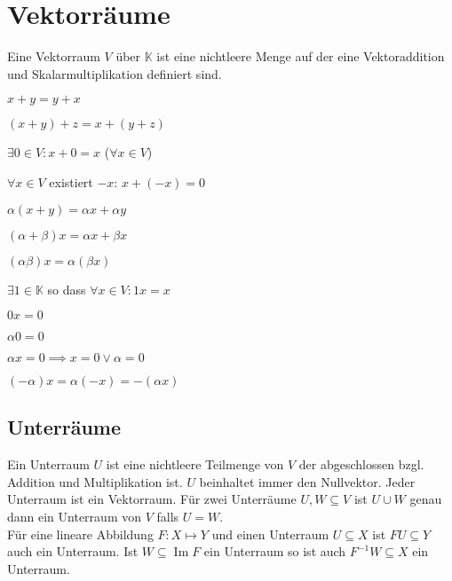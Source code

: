 \documentclass[a4paper,10pt]{article}
\DeclareMathOperator{\Image}{Im}
\def\K{\mathbb{K}}
\begin{document}
\section{Vektorräume}

\begin{mainbox}{}
  Eine Vektorraum $V$ über $\K$ ist eine nichtleere Menge auf der eine Vektoraddition und Skalarmultiplikation definiert sind.
  \begin{vaxioms}
    \item $x + y = y + x$
    \item $(x + y) + z = x + (y + z)$
    \item $\exists 0 \in V: x + 0 = x$ ($\forall x \in V$)
    \item $\forall x \in V$ existiert $-x$: $x + (-x) = 0$
    \item $\alpha(x + y) = \alpha x + \alpha y$
    \item $(\alpha + \beta)x = \alpha x + \beta x$
    \item $(\alpha \beta)x = \alpha (\beta x)$
    \item $\exists 1 \in \K$ so dass $\forall x \in V: 1x = x$
  \end{vaxioms}
\end{mainbox}

\begin{rowlist}
  \item $0x = 0$
  \item $\alpha 0 = 0$
  \item $\alpha x = 0 \implies x = 0 \vee \alpha = 0$
  \item $(-\alpha)x = \alpha (-x) = -(\alpha x)$
\end{rowlist}

\subsection{Unterräume}

Ein Unterraum $U$ ist eine nichtleere Teilmenge von $V$ der abgeschlossen bzgl. Addition und Multiplikation ist. $U$ beinhaltet immer den Nullvektor. Jeder Unterraum ist ein Vektorraum. Für zwei Unterräume $U, W \subseteq V$ ist $U \cup W$ genau dann ein Unterraum von $V$ falls $U = W$.\\

Für eine lineare Abbildung $F: X \mapsto Y$ und einen Unterraum $U \subseteq X$ ist $FU \subseteq Y$ auch ein Unterraum. Ist $W \subseteq \Image F$ ein Unterraum so ist auch $F^{-1}W \subseteq X$ ein Unterraum.
\end{document}
